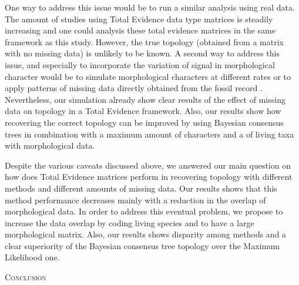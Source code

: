 \documentclass[12pt,letterpaper]{article}
\renewcommand{\section}[1]{%
\bigskip
\begin{center}
\begin{Large}
\normalfont\scshape #1
\medskip
\end{Large}
\end{center}}
\begin{document}

One way to address this issue would be to run a similar analysis using real data. The amount of studies using Total Evidence data type matrices is steadily increasing \citep[e.g.][]{ronquista2012,slaterphylogenetic2013,beckancient2014} and one could analysis these total evidence matrices in the same framework as this study. However, the true topology (obtained from a matrix with no missing data) is unlikely to be known. A second way to address this issue, and especially to incorporate the variation of signal in morphological character would be to simulate morphological characters at different rates \citep{wrightbayesian2014} or to apply patterns of missing data directly obtained from the fossil record \citep{pattinsonphylogeny2014}. Nevertheless, our simulation already show clear results of the effect of missing data on topology in a Total Evidence framework. Also, our results show how recovering the correct topology can be improved by using Bayesian consensus trees in combination with a maximum amount of characters and a of living taxa with morphological data.


Despite the various caveats discussed above, we answered our main question on how does Total Evidence matrices perform in recovering topology with different methods and different amounts of missing data.
Our results shows that this method performance decreases mainly with a reduction in the overlap of morphological data. In order to address this eventual problem, we propose to increase the data overlap by coding living species and to have a large morphological matrix. Also, our results shows disparity among methods and a clear superiority of the Bayesian consensus tree topology over the Maximum Likelihood one.

%
%

\section{Conclusion}
\end{document}
